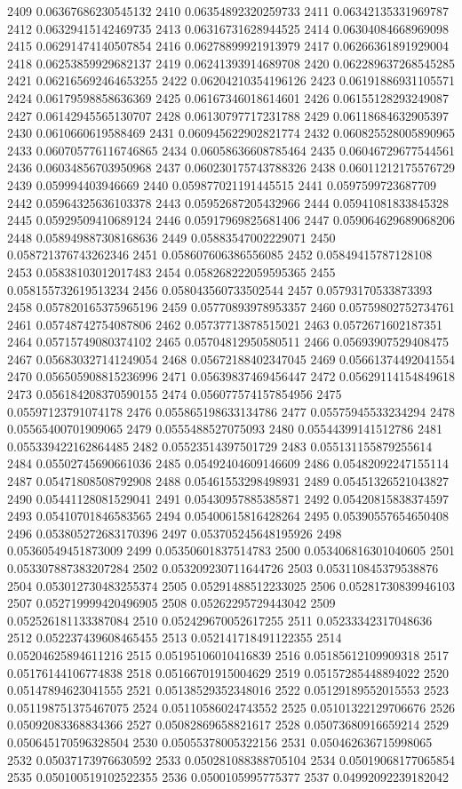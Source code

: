 2409 0.06367686230545132
2410 0.06354892320259733
2411 0.06342135331969787
2412 0.06329415142469735
2413 0.06316731628944525
2414 0.06304084668969098
2415 0.06291474140507854
2416 0.06278899921913979
2417 0.06266361891929004
2418 0.06253859929682137
2419 0.06241393914689708
2420 0.062289637268545285
2421 0.062165692464653255
2422 0.06204210354196126
2423 0.06191886931105571
2424 0.06179598858636369
2425 0.06167346018614601
2426 0.06155128293249087
2427 0.06142945565130707
2428 0.06130797717231788
2429 0.06118684632905397
2430 0.0610660619588469
2431 0.060945622902821774
2432 0.060825528005890965
2433 0.060705776116746865
2434 0.06058636608785464
2435 0.06046729677544561
2436 0.06034856703950968
2437 0.060230175743788326
2438 0.06011212175576729
2439 0.059994403946669
2440 0.059877021191445515
2441 0.0597599723687709
2442 0.05964325636103378
2443 0.05952687205432966
2444 0.05941081833845328
2445 0.05929509410689124
2446 0.05917969825681406
2447 0.059064629689068206
2448 0.058949887308168636
2449 0.05883547002229071
2450 0.058721376743262346
2451 0.058607606386556085
2452 0.05849415787128108
2453 0.05838103012017483
2454 0.058268222059595365
2455 0.058155732619513234
2456 0.058043560733502544
2457 0.05793170533873393
2458 0.057820165375965196
2459 0.05770893978953357
2460 0.05759802752734761
2461 0.05748742754087806
2462 0.05737713878515021
2463 0.0572671602187351
2464 0.05715749080374102
2465 0.05704812950580511
2466 0.05693907529408475
2467 0.056830327141249054
2468 0.05672188402347045
2469 0.05661374492041554
2470 0.056505908815236996
2471 0.05639837469456447
2472 0.05629114154849618
2473 0.056184208370590155
2474 0.056077574157854956
2475 0.05597123791074178
2476 0.055865198633134786
2477 0.05575945533234294
2478 0.05565400701909065
2479 0.0555488527075093
2480 0.05544399141512786
2481 0.055339422162864485
2482 0.05523514397501729
2483 0.055131155879255614
2484 0.05502745690661036
2485 0.05492404609146609
2486 0.05482092247155114
2487 0.05471808508792908
2488 0.05461553298498931
2489 0.05451326521043827
2490 0.05441128081529041
2491 0.05430957885385871
2492 0.05420815838374597
2493 0.05410701846583565
2494 0.05400615816428264
2495 0.05390557654650408
2496 0.053805272683170396
2497 0.053705245648195926
2498 0.05360549451873009
2499 0.05350601837514783
2500 0.053406816301040605
2501 0.053307887383207284
2502 0.053209230711644726
2503 0.053110845379538876
2504 0.053012730483255374
2505 0.05291488512233025
2506 0.05281730839946103
2507 0.052719999420496905
2508 0.05262295729443042
2509 0.052526181133387084
2510 0.052429670052617255
2511 0.05233342317048636
2512 0.052237439608465455
2513 0.052141718491122355
2514 0.05204625894611216
2515 0.05195106010416839
2516 0.05185612109909318
2517 0.05176144106774838
2518 0.05166701915004629
2519 0.05157285448894022
2520 0.05147894623041555
2521 0.05138529352348016
2522 0.05129189552015553
2523 0.051198751375467075
2524 0.05110586024743552
2525 0.05101322129706676
2526 0.05092083368834366
2527 0.05082869658821617
2528 0.05073680916659214
2529 0.050645170596328504
2530 0.05055378005322156
2531 0.050462636715998065
2532 0.05037173976630592
2533 0.050281088388705104
2534 0.05019068177065854
2535 0.050100519102522355
2536 0.0500105995775377
2537 0.04992092239182042
